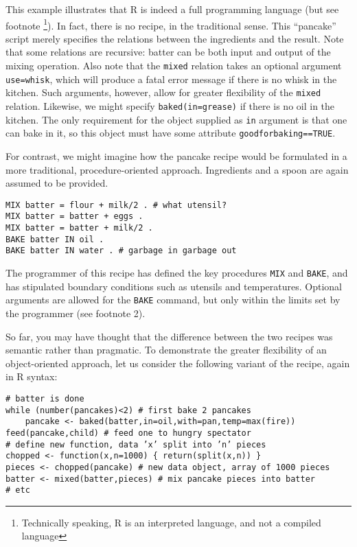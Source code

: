 \documentclass[]{book}
\begin{document}
This example illustrates that R is indeed a full
programming language (but see footnote \footnote{Technically speaking, R is an interpreted language, and not a compiled language}).
In fact, there is no recipe, in the
traditional sense. This ``pancake'' script merely specifies the relations
between the ingredients and the result. Note that some relations are
recursive: batter can be both input and output of the mixing operation.
Also note that the \texttt{mixed} relation takes an
optional argument \texttt{use=whisk}, which will produce
a fatal error message if there is no whisk in the kitchen. Such
arguments, however, allow for greater flexibility of the
\texttt{mixed} relation. Likewise, we might specify
\texttt{baked(in=grease)} if there is no oil in the
kitchen. The only requirement for the object supplied as
\texttt{in} argument is that one can bake in it, so this
object must have some attribute
\texttt{goodforbaking==TRUE}.

For contrast, we might imagine how the pancake recipe would be
formulated in a more traditional, procedure-oriented approach.
Ingredients and a spoon are again assumed to be provided.

\begin{verbatim}
MIX batter = flour + milk/2 . # what utensil? 
MIX batter = batter + eggs . 
MIX batter = batter + milk/2 .
BAKE batter IN oil .
BAKE batter IN water . # garbage in garbage out
\end{verbatim}

The programmer of this recipe has defined the key procedures \texttt{MIX} and
\texttt{BAKE}, and has stipulated boundary conditions such as utensils and
temperatures. Optional arguments are allowed for the \texttt{BAKE} command, but
only within the limits set by the programmer (see footnote 2).

So far, you may have thought that the difference between the two recipes
was semantic rather than pragmatic. To demonstrate the greater
flexibility of an object-oriented approach, let us consider the
following variant of the recipe, again in R syntax:

\begin{verbatim}
# batter is done
while (number(pancakes)<2) # first bake 2 pancakes
    pancake <- baked(batter,in=oil,with=pan,temp=max(fire))
feed(pancake,child) # feed one to hungry spectator
# define new function, data ’x’ split into ’n’ pieces
chopped <- function(x,n=1000) { return(split(x,n)) } 
pieces <- chopped(pancake) # new data object, array of 1000 pieces
batter <- mixed(batter,pieces) # mix pancake pieces into batter
# etc
\end{verbatim}
\end{document}
